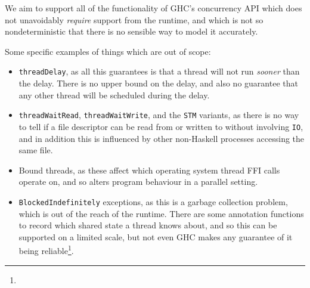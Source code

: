 We aim to support all of the functionality of GHC's concurrency API
which does not unavoidably \emph{require} support from the runtime,
and which is not so nondeterministic that there is no sensible way to
model it accurately.

Some specific examples of things which are out of scope:

\begin{itemize}
\item \verb|threadDelay|, as all this guarantees is that a thread will
  not run \textit{sooner} than the delay. There is no upper bound on
  the delay, and also no guarantee that any other thread will be
  scheduled during the delay.

\item \verb|threadWaitRead|, \verb|threadWaitWrite|, and the
  \verb|STM| variants, as there is no way to tell if a file descriptor
  can be read from or written to without involving \verb|IO|, and in
  addition this is influenced by other non-Haskell processes accessing
  the same file.

\item Bound threads, as these affect which operating system thread FFI
  calls operate on, and so alters program behaviour in a parallel
  setting.

\item \verb|BlockedIndefinitely| exceptions, as this is a garbage
  collection problem, which is out of the reach of the runtime. There
  are some annotation functions to record which shared state a thread
  knows about, and so this can be supported on a limited scale, but
  not even GHC makes any guarantee of it being reliable\footnote{
    }.
\end{itemize}
